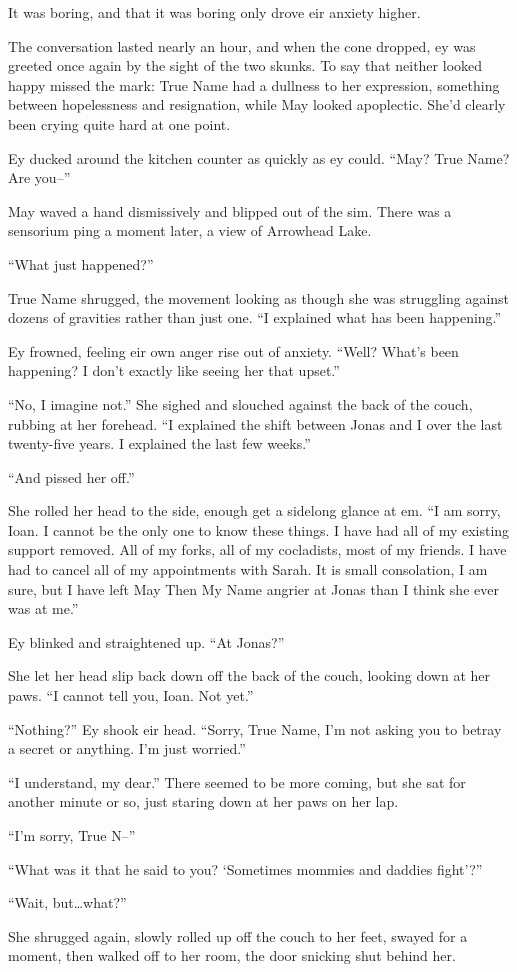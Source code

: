 It was boring, and that it was boring only drove eir anxiety higher.

The conversation lasted nearly an hour, and when the cone dropped, ey was greeted once again by the sight of the two skunks. To say that neither looked happy missed the mark: True Name had a dullness to her expression, something between hopelessness and resignation, while May looked apoplectic. She'd clearly been crying quite hard at one point.

Ey ducked around the kitchen counter as quickly as ey could. ``May? True Name? Are you--''

May waved a hand dismissively and blipped out of the sim. There was a sensorium ping a moment later, a view of Arrowhead Lake.

``What just happened?''

True Name shrugged, the movement looking as though she was struggling against dozens of gravities rather than just one. ``I explained what has been happening.''

Ey frowned, feeling eir own anger rise out of anxiety. ``Well? What's been happening? I don't exactly like seeing her that upset.''

``No, I imagine not.'' She sighed and slouched against the back of the couch, rubbing at her forehead. ``I explained the shift between Jonas and I over the last twenty-five years. I explained the last few weeks.''

``And pissed her off.''

She rolled her head to the side, enough get a sidelong glance at em. ``I am sorry, Ioan. I cannot be the only one to know these things. I have had all of my existing support removed. All of my forks, all of my cocladists, most of my friends. I have had to cancel all of my appointments with Sarah. It is small consolation, I am sure, but I have left May Then My Name angrier at Jonas than I think she ever was at me.''

Ey blinked and straightened up. ``At Jonas?''

She let her head slip back down off the back of the couch, looking down at her paws. ``I cannot tell you, Ioan. Not yet.''

``Nothing?'' Ey shook eir head. ``Sorry, True Name, I'm not asking you to betray a secret or anything. I'm just worried.''

``I understand, my dear.'' There seemed to be more coming, but she sat for another minute or so, just staring down at her paws on her lap.

``I'm sorry, True N--''

``What was it that he said to you? `Sometimes mommies and daddies fight'?''

``Wait, but\ldots what?''

She shrugged again, slowly rolled up off the couch to her feet, swayed for a moment, then walked off to her room, the door snicking shut behind her.
